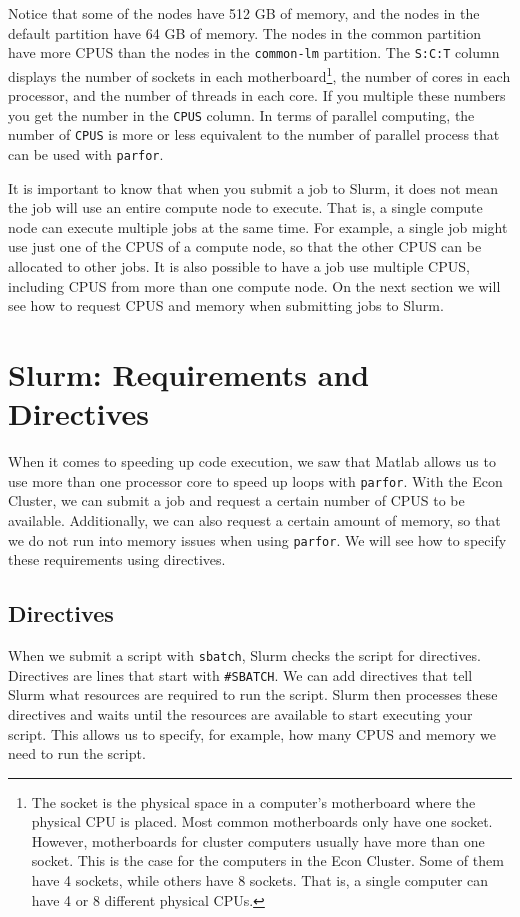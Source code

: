 \documentclass[12pt, a4paper]{article}
\begin{document}
Notice that some of the nodes have 512 GB of memory, and the nodes in the default partition have 64 GB of memory.
The nodes in the common partition have more CPUS than the nodes in the \texttt{common-lm} partition.
The \texttt{S:C:T} column displays the number of sockets in each motherboard\footnote{The socket is the physical space in a computer's motherboard where the physical CPU is placed. Most common motherboards only have one socket. However, motherboards for cluster computers usually have more than one socket. This is the case for the computers in the Econ Cluster. Some of them have 4 sockets, while others have 8 sockets. That is, a single computer can have 4 or 8 different physical CPUs.}, the number of cores in each processor, and the number of threads in each core.
If you multiple these numbers you get the number in the \texttt{CPUS} column.
In terms of parallel computing, the number of \texttt{CPUS} is more or less equivalent to the number of parallel process that can be used with \texttt{parfor}.

It is important to know that when you submit a job to Slurm, it does not mean the job will use an entire compute node to execute.
That is, a single compute node can execute multiple jobs at the same time.
For example, a single job might use just one of the CPUS of a compute node, so that the other CPUS can be allocated to other jobs.
It is also possible to have a job use multiple CPUS, including CPUS from more than one compute node.
On the next section we will see how to request CPUS and memory when submitting jobs to Slurm.
\section{Slurm: Requirements and Directives}
\label{sec:org90e0802}
When it comes to speeding up code execution, we saw that Matlab allows us to use more than one processor core to speed up loops with \texttt{parfor}.
With the Econ Cluster, we can submit a job and request a certain number of CPUS to be available.
Additionally, we can also request a certain amount of memory, so that we do not run into memory issues when using \texttt{parfor}.
We will see how to specify these requirements using directives.
\subsection{Directives}
\label{sec:orgd2e990a}
When we submit a script with \texttt{sbatch}, Slurm checks the script for directives.
Directives are lines that start with \texttt{\#SBATCH}.
We can add directives that tell Slurm what resources are required to run the script.
Slurm then processes these directives and waits until the resources are available to start executing your script.
This allows us to specify, for example, how many CPUS and memory we need to run the script.
\end{document}

